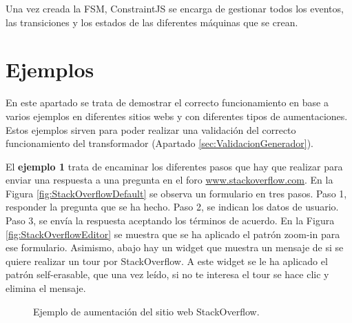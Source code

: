 Una vez creada la FSM, ConstraintJS se encarga de gestionar todos los eventos, las transiciones y los estados de las diferentes máquinas que se crean.

\section{Ejemplos}
\label{sec:EjemplosGenerador}

En este apartado se trata de demostrar el correcto funcionamiento en base a varios ejemplos en diferentes sitios webs y con diferentes tipos de aumentaciones. Estos ejemplos sirven para poder realizar una validación del correcto funcionamiento del transformador (Apartado \ref{sec:ValidacionGenerador}).

El \textbf{ejemplo 1} trata de encaminar los diferentes pasos que hay que realizar para enviar una respuesta a una pregunta en el foro \url{www.stackoverflow.com}. En la Figura \ref{fig:StackOverflowDefault} se observa un formulario en tres pasos. Paso 1, responder la pregunta que se ha hecho. Paso 2, se indican los datos de usuario. Paso 3, se envía la respuesta aceptando los términos de acuerdo. En la Figura \ref{fig:StackOverflowEditor} se muestra que se ha aplicado el patrón zoom-in para ese formulario. Asimismo, abajo hay un widget que muestra un mensaje de si se quiere realizar un tour por StackOverflow. A este widget se le ha aplicado el patrón self-erasable, que una vez leído, si no te interesa el tour se hace clic y elimina el mensaje.

\begin{figure}
\centering
{}
\caption{Ejemplo de aumentación del sitio web StackOverflow.}
\label{fig:StackOverflowExample}
\end{figure}

